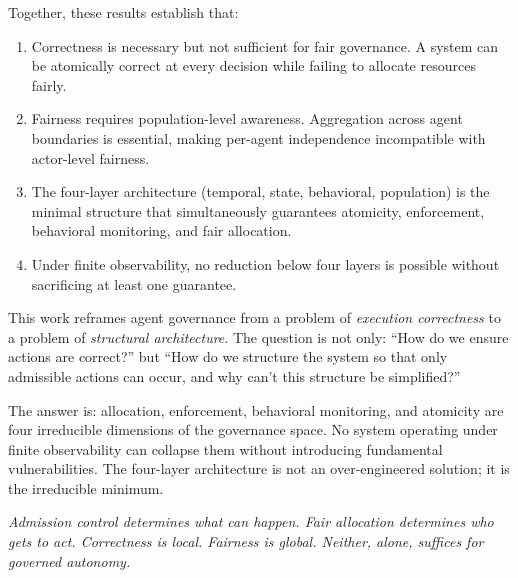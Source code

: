 \documentclass[11pt]{article}
\begin{document}
Together, these results establish that:

\begin{enumerate}[label=(\roman*),noitemsep]
  \item Correctness is necessary but not sufficient for fair governance. A system can be atomically correct at every decision while failing to allocate resources fairly.

  \item Fairness requires population-level awareness. Aggregation across agent boundaries is essential, making per-agent independence incompatible with actor-level fairness.

  \item The four-layer architecture (temporal, state, behavioral, population) is the minimal structure that simultaneously guarantees atomicity, enforcement, behavioral monitoring, and fair allocation.

  \item Under finite observability, no reduction below four layers is possible without sacrificing at least one guarantee.
\end{enumerate}

This work reframes agent governance from a problem of \emph{execution correctness} to a problem of \emph{structural architecture}. The question is not only: ``How do we ensure actions are correct?'' but ``How do we structure the system so that only admissible actions can occur, and why can't this structure be simplified?''

The answer is: allocation, enforcement, behavioral monitoring, and atomicity are four irreducible dimensions of the governance space. No system operating under finite observability can collapse them without introducing fundamental vulnerabilities. The four-layer architecture is not an over-engineered solution; it is the irreducible minimum.

\medskip
\noindent\textit{Admission control determines what can happen. Fair allocation determines who gets to act. Correctness is local. Fairness is global. Neither, alone, suffices for governed autonomy.}



\end{document}
